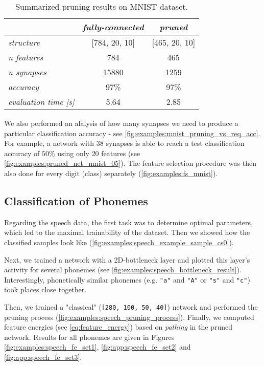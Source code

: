 \begin{table}[H]
\centering
\begin{tabular}{|l|c|c|}
\hline
                                 & \textit{fully-connected} & \textit{pruned}   \\ \hline
\textit{structure}               & {[}784, 20, 10{]}        & {[}465, 20, 10{]} \\ \hline
\textit{n features}              & 784                      & 465               \\ \hline
\textit{n synapses}              & 15880                    & 1259              \\ \hline
\textit{accuracy}                & 97\%                     & 97\%              \\ \hline
\textit{evaluation time {[}s{]}} & 5.64                     & 2.85              \\ \hline
\end{tabular}
\caption{Summarized pruning results on MNIST dataset.}
\label{tab:discussion:pruning_results_mnist}
\end{table}

We also performed an alalysis of how many synapses we need to produce a particular classification accuracy - see \cref{fig:examples:mnist_pruning_vs_req_acc}. For example, a network with $ 38 $ synapses is able to reach a test classification accuracy of $ 50\% $ using only $ 20 $ features (see \cref{fig:examples:pruned_net_mnist_05}). The feature selection procedure was then also done for every digit (class) separately (\cref{fig:examples:fs_mnist}).

\subsection*{Classification of Phonemes}
Regarding the speech data, the first task was to determine optimal parameters, which led to the maximal trainability of the dataset. Then we showed how the classified samples look like (\cref{fig:examples:speech_example_sample_cs0}).

Next, we trained a network with a 2D-bottleneck layer and plotted this layer's activity for several phonemes (see \cref{fig:examples:speech_bottleneck_result}). Interestingly, phonetically similar phonemes (e.g. \texttt{"a"} and \texttt{"A"} or \texttt{"s"} and \texttt{"c"}) took places close together. 

Then, we trained a "classical" (\texttt{[280, 100, 50, 40]}) network and performed the pruning process (\cref{fig:examples:speech_pruning_process}). Finally, we computed feature energies (see \cref{eq:feature_energy}) based on \textit{pathing} in the pruned network. Results for all phonemes are given in Figures \ref{fig:examples:speech_fe_set1}, \ref{fig:app:speech_fe_set2} and \ref{fig:app:speech_fe_set3}.

